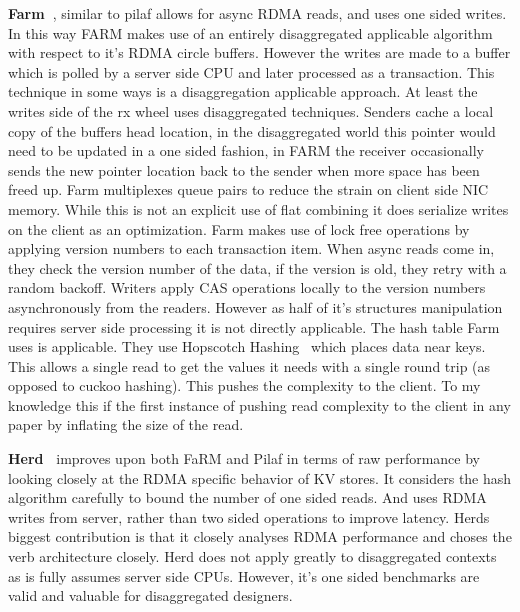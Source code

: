 \textbf{Farm~\cite{farm}}, similar to pilaf allows for async RDMA reads, and
uses one sided writes. In this way FARM makes use of an entirely disaggregated
applicable algorithm with respect to it's RDMA circle buffers. 
However the writes are made to a buffer which is polled by a server side CPU and
later processed as a transaction. This technique in some ways is a
disaggregation applicable approach. At least the writes side of the rx wheel
uses disaggregated techniques. Senders cache a local copy of the buffers head
location, in the disaggregated world this pointer would need to be updated in a
one sided fashion, in FARM the receiver occasionally sends the new pointer
location back to the sender when more space has been freed up.
Farm multiplexes queue pairs to reduce the strain on client side NIC memory.
While this is not an explicit use of flat combining it does serialize writes on
the client as an optimization.
Farm makes use of lock free operations by applying version numbers to each
transaction item. When async reads come in, they check the version number of the
data, if the version is old, they retry with a random backoff. Writers apply CAS
operations locally to the version numbers asynchronously from the readers.
However as half of it's structures manipulation requires server side processing
it is not directly applicable. The hash table Farm uses is applicable. They use
Hopscotch Hashing~\cite{hopscotch} which places data near keys. This allows a
single read to get the values it needs with a single round trip (as opposed to
cuckoo hashing). This pushes the complexity to the client. To my knowledge this
if the first instance of pushing read complexity to the client in any paper by
inflating the size of the read.


\textbf{Herd~\cite{herd}} improves upon both FaRM and Pilaf in terms of raw performance by looking
closely at the RDMA specific behavior of KV stores. It considers the hash
algorithm carefully to bound the number of one sided reads. And uses RDMA writes
from server, rather than two sided operations to improve latency. Herds biggest
contribution is that it closely analyses RDMA performance and choses the verb
architecture closely. Herd does not apply greatly to disaggregated contexts as
is fully assumes server side CPUs. However, it's one sided benchmarks are valid
and valuable for disaggregated designers.


